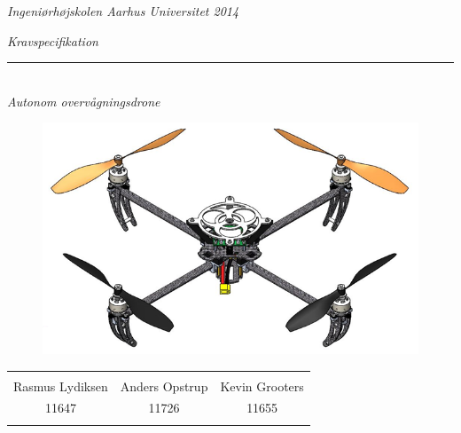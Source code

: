 \thispagestyle{empty}

\begin{center}
\textsl{Ingeniørhøjskolen Aarhus Universitet 2014 } \\ \vspace{0.5cm}

\phantom{hul}

\textsl{\HUGE Kravspecifikation } \\ \vspace{0cm}
\rule{15cm}{0.5mm}  \\ \vspace{0.5cm}
\textsl{\LARGE Autonom overvågningsdrone } \\ \vspace{0.5cm}

\vspace{3.5cm}

\begin{figure}[H]
\centering
\includegraphics[width=1\textwidth]{Billeder/Forsidebillede.png}
\label{fig:Forside_foranalyse}
\end{figure}


\vspace{3.5cm}

\begin{table}[H]
	\centering
		\begin{tabular}{c c c}
			\underline{\phantom{mmmmmmmmmmmmmm}} & \underline{\phantom{mmmmmmmmmmmmmm}} & \underline{\phantom{mmmmmmmmmmmmmm}} \\
			Rasmus Lydiksen			& Anders Opstrup 		& Kevin Grooters 			\\
			11647					& 11726					& 11655\\
			&&\\												
		\end{tabular}
\end{table}
\end{center}


